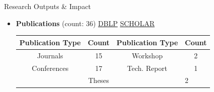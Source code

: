 \section{\faBinoculars}{Research Outputs \& Impact}
\begin{itemize}[noitemsep]
    \item \textbf{Publications} (count: 36) \hspace{10pt} \href{https://tinyurl.com/rrs885n}{\aidblp \hspace{5pt} DBLP} \hspace{10pt} \href{https://tinyurl.com/u92ce6l}{\aiGoogleScholarSquare \hspace{5pt} SCHOLAR}
        \begin{table}[!h]
            \begin{tabular}{|ccc|l|}
                \hline
                \multicolumn{1}{|l|}{\textbf{Publication Type}} & \multicolumn{1}{l|}{\textbf{Count}} & \multicolumn{1}{l|}{\textbf{Publication Type}} & \textbf{Count}         \\ \hline
                \multicolumn{1}{|c|}{Journals}                  & \multicolumn{1}{c|}{15}             & Workshop                                       & \multicolumn{1}{c|}{2} \\ \hline
                \multicolumn{1}{|c|}{Conferences}               & \multicolumn{1}{c|}{17}             & Tech. Report                                   & \multicolumn{1}{c|}{1} \\ \hline
                \multicolumn{3}{|c|}{Theses}                                                                                                           & 2                      \\ \hline
            \end{tabular}
            \end{table}
\end{itemize}